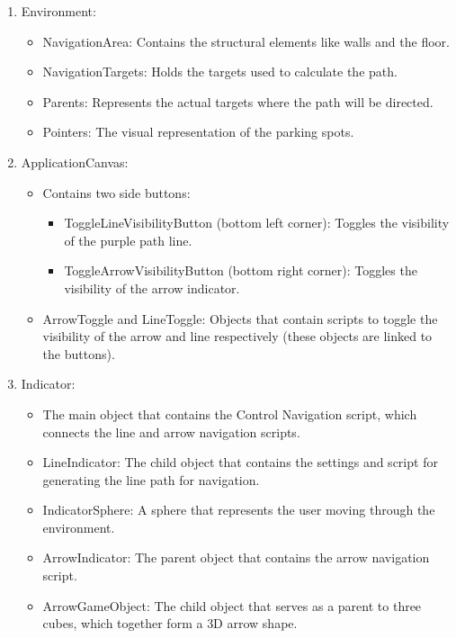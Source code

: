 \documentclass[11pt]{article}
\begin{document}
\begin{multicols}{2}
\begin{enumerate}
	    \item Environment:
	    \begin{itemize}
	        \item NavigationArea: Contains the structural elements like walls and the floor.
	        \item NavigationTargets: Holds the targets used to calculate the path.
	        \item Parents: Represents the actual targets where the path will be directed.
	        \item Pointers: The visual representation of the parking spots.
	    \end{itemize}
	
	    \item ApplicationCanvas:
	    \begin{itemize}
	        \item Contains two side buttons:
	        \begin{itemize}
	            \item ToggleLineVisibilityButton (bottom left corner): Toggles the visibility of the purple path line.
	            \item ToggleArrowVisibilityButton (bottom right corner): Toggles the visibility of the arrow indicator.
	        \end{itemize}
	        \item ArrowToggle and LineToggle: Objects that contain scripts to toggle the visibility of the arrow and line respectively (these objects are linked to the buttons).
	    \end{itemize}
	
	    \item Indicator:
	    \begin{itemize}
	        \item The main object that contains the Control Navigation script, which connects the line and arrow navigation scripts.
	        \item LineIndicator: The child object that contains the settings and script for generating the line path for navigation.
	        \item IndicatorSphere: A sphere that represents the user moving through the environment.
	        \item ArrowIndicator: The parent object that contains the arrow navigation script.
	        \item ArrowGameObject: The child object that serves as a parent to three cubes, which together form a 3D arrow shape.
	    \end{itemize}
    \end{enumerate}


\end{multicols}
\end{document}
